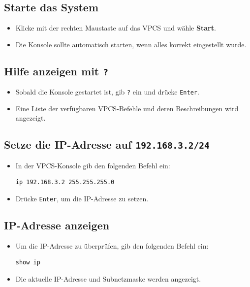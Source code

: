 \documentclass[12pt, a4paper]{article}\usepackage{listings}
\begin{document}
\subsection{Starte das System}
\begin{itemize}
    \item Klicke mit der rechten Maustaste auf das VPCS und wähle \textbf{Start}.
    \item Die Konsole sollte automatisch starten, wenn alles korrekt eingestellt wurde.
\end{itemize}

\subsection{Hilfe anzeigen mit \texttt{?}}
\begin{itemize}
    \item Sobald die Konsole gestartet ist, gib \texttt{?} ein und drücke \texttt{Enter}.
    \item Eine Liste der verfügbaren VPCS-Befehle und deren Beschreibungen wird angezeigt.
\end{itemize}

\subsection{Setze die IP-Adresse auf \texttt{192.168.3.2/24}}
\begin{itemize}
    \item In der VPCS-Konsole gib den folgenden Befehl ein:
    \begin{verbatim}
ip 192.168.3.2 255.255.255.0
    \end{verbatim}
    \item Drücke \texttt{Enter}, um die IP-Adresse zu setzen.
\end{itemize}

\subsection{IP-Adresse anzeigen}
\begin{itemize}
    \item Um die IP-Adresse zu überprüfen, gib den folgenden Befehl ein:
    \begin{verbatim}
show ip
    \end{verbatim}
    \item Die aktuelle IP-Adresse und Subnetzmaske werden angezeigt.
\end{itemize}
\end{document}
